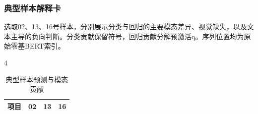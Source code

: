 \hypertarget{q3-ux5178ux578bux6837ux672cux89e3ux91caux5361}{%
\subsubsection{典型样本解释卡}\label{q3-ux5178ux578bux6837ux672cux89e3ux91caux5361}}

选取02、13、16号样本，分别展示分类与回归的主要模态差异、视觉缺失，以及文本主导的负向判断。分类贡献保留符号，回归贡献分解预激活q。序列位置均为原始零基BERT索引。

\begin{PaperTable}{4}

\begin{table}[!htbp]
\centering\caption{典型样本预测与模态贡献\label{q3-tab17}}
\begin{tabular}{@{}llll@{}}
\toprule
\begin{minipage}[b]{\dimexpr 0.340000\linewidth-2.040000\tabcolsep\relax}\raggedright
项目\strut
\end{minipage} & \begin{minipage}[b]{\dimexpr 0.220000\linewidth-1.320000\tabcolsep\relax}\raggedright
02\strut
\end{minipage} & \begin{minipage}[b]{\dimexpr 0.220000\linewidth-1.320000\tabcolsep\relax}\raggedright
13\strut
\end{minipage} & \begin{minipage}[b]{\dimexpr 0.220000\linewidth-1.320000\tabcolsep\relax}\raggedright
16\strut
\end{minipage}\tabularnewline
\midrule


\end{tabular}
\end{table}
\end{PaperTable}
